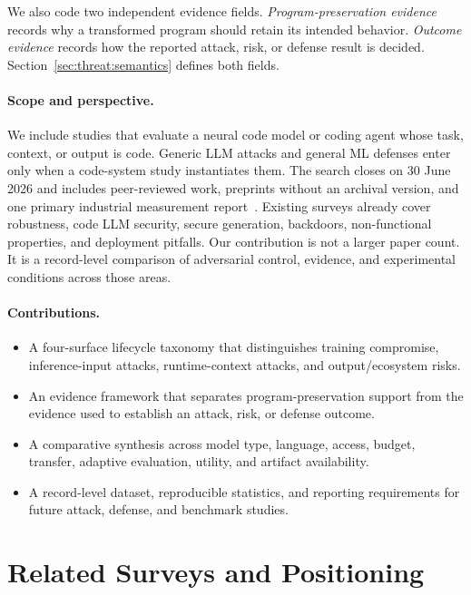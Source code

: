 \documentclass[acmsmall,screen,review]{acmart}
\begin{document}
We also code two independent evidence fields. \emph{Program-preservation evidence} records why a transformed program should retain its intended behavior. \emph{Outcome evidence} records how the reported attack, risk, or defense result is decided. Section~\ref{sec:threat:semantics} defines both fields.

\paragraph*{Scope and perspective.} We include studies that evaluate a neural code model or coding agent whose task, context, or output is code. Generic LLM attacks and general ML defenses enter only when a code-system study instantiates them. The search closes on 30 June 2026 and includes peer-reviewed work, preprints without an archival version, and one primary industrial measurement report~\cite{ziegler2021recitation}. Existing surveys already cover robustness, code LLM security, secure generation, backdoors, non-functional properties, and deployment pitfalls. Our contribution is not a larger paper count. It is a record-level comparison of adversarial control, evidence, and experimental conditions across those areas.

\paragraph*{Contributions.}
\begin{itemize}
\item A four-surface lifecycle taxonomy that distinguishes training compromise, inference-input attacks, runtime-context attacks, and output/ecosystem risks.
\item An evidence framework that separates program-preservation support from the evidence used to establish an attack, risk, or defense outcome.
\item A comparative synthesis across model type, language, access, budget, transfer, adaptive evaluation, utility, and artifact availability.
\item A record-level dataset, reproducible statistics, and reporting requirements for future attack, defense, and benchmark studies.
\end{itemize}

\section{Related Surveys and Positioning} \label{sec:related}
\end{document}
